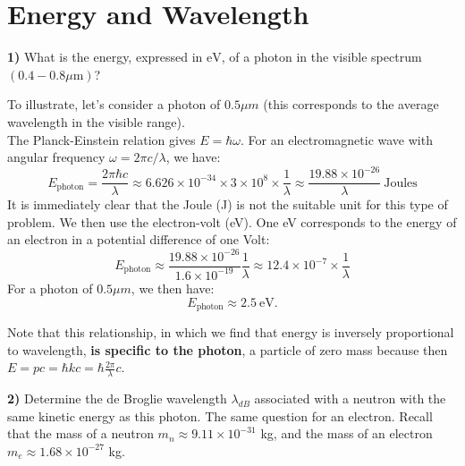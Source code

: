 \section{Energy and Wavelength}

\noindent \textbf{1)} What is the energy, expressed in $\mathrm{eV}$, of a photon in the visible spectrum $(0.4-0.8 \mu \mathrm{m})$? \\

\begin{breakbox}
    \noindent To illustrate, let's consider a photon of $0.5 \mu m$ (this corresponds to the average wavelength in the visible range).\\
    The Planck-Einstein relation gives $E = \hbar \omega$.
    For an electromagnetic wave with angular frequency $\omega = 2\pi c /\lambda$, we have:
    \begin{equation*}
        E_{\text{photon}} = \frac{2\pi \hbar c}{\lambda} \approx 6.626 \times 10^{-34} \times 3 \times 10^8 \times \frac{1}{\lambda} \approx \frac{19.88 \times 10^{-26}}{\lambda} \: \text{Joules}
    \end{equation*}
    It is immediately clear that the Joule (J) is not the suitable unit for this type of problem.
    We then use the electron-volt (eV). One eV corresponds to the energy of an electron in a potential difference of one Volt:
    \begin{equation*}
        E_{\text{photon}} \approx \frac{19.88 \times 10^{-26}}{1.6 \times 10^{-19}} \frac{1}{\lambda} \approx 12.4 \times 10^{-7} \times \frac{1}{\lambda}
    \end{equation*}
    For a photon of $0.5 \mu m$, we then have:
    \begin{equation*}
        \boxed{E_{\text{photon}} \approx 2.5 \: \text{eV}.}
    \end{equation*}

    \noindent Note that this relationship, in which we find that energy is inversely proportional to wavelength, \textbf{is specific to the photon}, a particle of zero mass because then $E = pc = \hbar k c = \hbar \frac{2\pi}{\lambda}c$.
\end{breakbox}

\medskip

\noindent \textbf{2)} Determine the de Broglie wavelength $\lambda_{dB}$ associated with a neutron with the same kinetic energy as this photon. The same question for an electron. Recall that the mass of a neutron $m_n \approx 9.11 \times 10^{-31}$ kg, and the mass of an electron $m_e \approx 1.68 \times 10^{-27}$ kg.\\


